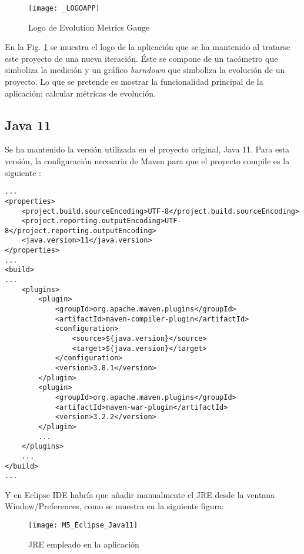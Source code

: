 \begin{figure}[!h]
	\centering
	\texttt{[image: \_LOGOAPP]}
	\caption{Logo de Evolution Metrics Gauge}\label{fig:_LOGOAPP}
\end{figure}
\FloatBarrier

En la Fig. \ref{fig:_LOGOAPP} se muestra el logo de la aplicación que se ha mantenido al tratarse este proyecto de una nueva iteración. Éste se compone de un tacómetro que simboliza la medición y un gráfico \textit{burndown} que simboliza la evolución de un proyecto. Lo que se pretende es mostrar la funcionalidad principal de la aplicación: calcular métricas de evolución.


\subsection{Java 11}
Se ha mantenido la versión utilizada en el proyecto original\cite{TFGPrevio}, Java 11.
Para esta versión, la configuración necesaria de Maven para que el proyecto compile es la siguiente :


\begin{minipage}{\linewidth}
{\tiny
\begin{verbatim}
...
<properties>
	<project.build.sourceEncoding>UTF-8</project.build.sourceEncoding>
	<project.reporting.outputEncoding>UTF-8</project.reporting.outputEncoding>
	<java.version>11</java.version>
</properties>
...
<build>
...
	<plugins>
		<plugin>
			<groupId>org.apache.maven.plugins</groupId>
			<artifactId>maven-compiler-plugin</artifactId>
			<configuration>
				<source>${java.version}</source>
				<target>${java.version}</target>
			</configuration>
			<version>3.8.1</version>
		</plugin>
		<plugin>
			<groupId>org.apache.maven.plugins</groupId>
			<artifactId>maven-war-plugin</artifactId>
			<version>3.2.2</version>
		</plugin>
		...
	</plugins>
	...
</build>
...
\end{verbatim}
}
\end{minipage}

\newpage
Y en Eclipse IDE habría que añadir manualmente el JRE desde la ventana Window/Preferences, como se muestra en la siguiente figura: 

\begin{figure}[!h]
	\centering
	\texttt{[image: M5\_Eclipse\_Java11]}
	\caption{JRE empleado en la aplicación}\label{fig:M5_Eclipse_Java11}
\end{figure}
\FloatBarrier



